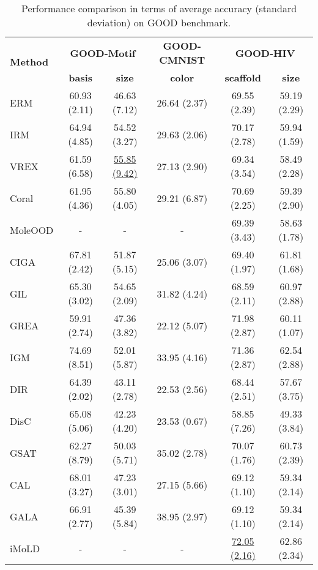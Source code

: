\begin{table}[h!] 
\caption{Performance comparison in terms of average accuracy (standard deviation) on GOOD benchmark.}
\centering
\begin{tabular}{l|cc|c|cc}
\toprule
\multirow{2}{*}{\textbf{Method}}           & \multicolumn{2}{c|}{\textbf{GOOD-Motif}} & \multicolumn{1}{c|}{\textbf{GOOD-CMNIST}} & \multicolumn{2}{c}{\textbf{GOOD-HIV}} \\
           & \textbf{basis}         & \textbf{size}          & \textbf{color}         & \textbf{scaffold}      & \textbf{size} \\
\midrule
ERM        & 60.93 (2.11)  & 46.63 (7.12)   & 26.64 (2.37)   & 69.55 (2.39)   & 59.19 (2.29)\\
IRM        & 64.94 (4.85)   & {54.52 (3.27)}   & 29.63 (2.06)   & 70.17 (2.78)   & 59.94 (1.59)\\
VREX       & 61.59 (6.58)   & \underline{55.85 (9.42)}   & 27.13 (2.90)   & 69.34 (3.54)   & 58.49 (2.28)\\
Coral      & 61.95 (4.36)  & 55.80 (4.05)   & 29.21 (6.87)   & 70.69 (2.25)   & 59.39 (2.90)\\
\midrule
MoleOOD      & -  & -   & -  & 69.39 (3.43)   & 58.63 (1.78)\\
CIGA       & 67.81 (2.42)   & 51.87 (5.15)   & 25.06 (3.07)   & 69.40 (1.97)   & {61.81 (1.68)}\\
GIL      & 65.30 (3.02)   & 54.65 (2.09)   & 31.82 (4.24)   & 68.59 (2.11)   & 60.97 (2.88)\\
GREA      & 59.91 (2.74)   & 47.36 (3.82)   & 22.12 (5.07)   & {71.98 (2.87)}   & 60.11 (1.07)\\
IGM    & {74.69 (8.51) }  & 52.01 (5.87)   & 33.95 (4.16)   & {71.36 (2.87)}   & 62.54 (2.88)\\
\midrule
DIR        & 64.39 (2.02)   & 43.11 (2.78)   & 22.53 (2.56)   & 68.44 (2.51)   & 57.67 (3.75)\\
DisC       & 65.08 (5.06)  & 42.23 (4.20)   & 23.53 (0.67)   & 58.85 (7.26)  & 49.33 (3.84)         \\ 
\midrule
GSAT       & 62.27 (8.79)   & 50.03 (5.71)   & {35.02 (2.78)}   & 70.07 (1.76)   & 60.73 (2.39)\\
CAL       & {68.01 (3.27)}   & 47.23 (3.01)   & 27.15 (5.66)   & 69.12 (1.10)   & 59.34 (2.14)\\
GALA       & {66.91 (2.77)}   & 45.39 (5.84)   & {38.95 (2.97)}   & 69.12 (1.10)   & 59.34 (2.14)\\
iMoLD      & - & - & -  & \underline{72.05 (2.16)}   & {62.86 (2.34)}\\

\end{tabular}
\end{table}

